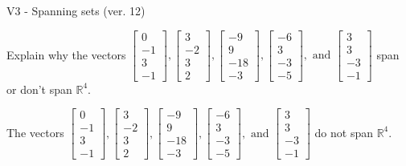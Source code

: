 \begin{exercise}
  \begin{exerciseTitle}V3 - Spanning sets (ver. 12)\end{exerciseTitle}
  \begin{exerciseStatement}
    Explain why the vectors \(\left[\begin{array}{r}
0 \\
-1 \\
3 \\
-1
\end{array}\right] , \left[\begin{array}{r}
3 \\
-2 \\
3 \\
2
\end{array}\right] , \left[\begin{array}{r}
-9 \\
9 \\
-18 \\
-3
\end{array}\right] , \left[\begin{array}{r}
-6 \\
3 \\
-3 \\
-5
\end{array}\right] , \text{ and } \left[\begin{array}{r}
3 \\
3 \\
-3 \\
-1
\end{array}\right]\) span or don't span \(\mathbb{R}^4\). 
	


  \end{exerciseStatement}
  \begin{exerciseAnswer}
   The vectors \(\left[\begin{array}{r}
0 \\
-1 \\
3 \\
-1
\end{array}\right] , \left[\begin{array}{r}
3 \\
-2 \\
3 \\
2
\end{array}\right] , \left[\begin{array}{r}
-9 \\
9 \\
-18 \\
-3
\end{array}\right] , \left[\begin{array}{r}
-6 \\
3 \\
-3 \\
-5
\end{array}\right] , \text{ and } \left[\begin{array}{r}
3 \\
3 \\
-3 \\
-1
\end{array}\right]\) 
  	 do not  
	span \(\mathbb{R}^4\).
  



\end{exerciseAnswer}
\end{exercise}
